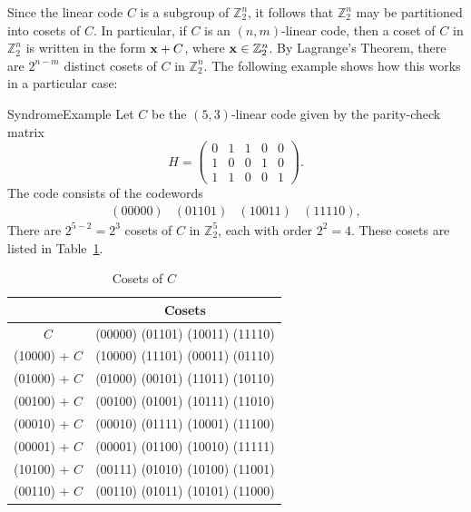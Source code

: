 Since the
linear code $C$ is a subgroup of $\mathbb{Z}_2^n$, it follows that $\mathbb{Z}_2^n$ 
may be partitioned into cosets of $C$. 
In particular,  if $C$ is an $(n,m)$-linear code, then a coset of $C$ in $\mathbb{Z}_2^n$ is written in
the form ${\bold x} + C$, where ${\bold x} \in \mathbb{Z}_2^n$. By Lagrange's Theorem, 
there are $2^{n-m}$ distinct cosets of $C$ in $\mathbb{Z}_2^n$. The following example shows how 
this works in a particular case:

 
\begin{example}{SyndromeExample}
Let $C$ be the $(5,3)$-linear code given by the parity-check matrix
\[
H =
\left(
\begin{array}{cccccc}
0 & 1 & 1 & 0 & 0 \\
1 & 0 & 0 & 1 & 0 \\
1 & 1 & 0 & 0 & 1
\end{array}
\right).
\]
The code consists of the codewords
\[
\begin{array}{cccc}
(00000)& (01101)& (10011)& (11110),
\end{array}
\]
There are $2^{5-2} = 2^3$ cosets of $C$ in $\mathbb{Z}_2^5$, each with
order $2^2 =4$.  These cosets are listed in Table~\ref{table:ErrorAndCorrectionCode:cosets}. 
\end{example}
 
 
\begin{table}
\caption{Cosets of $C$\label{table:ErrorAndCorrectionCode:cosets}}{\small
\begin{center}
\begin{tabular}{|c|c|}
\hline
 & Cosets \\
\hline
          $C$ & (00000)  (01101)  (10011)  (11110) \\
(10000) + $C$ & (10000)  (11101)  (00011)  (01110) \\
(01000) + $C$ & (01000)  (00101)  (11011)  (10110) \\
(00100) + $C$ & (00100)  (01001)  (10111)  (11010) \\
(00010) + $C$ & (00010)  (01111)  (10001)  (11100) \\
(00001) + $C$ & (00001)  (01100)  (10010)  (11111) \\
(10100) + $C$ & (00111)  (01010)  (10100)  (11001) \\
(00110) + $C$ & (00110)  (01011)  (10101)  (11000) \\
\hline
\end{tabular}
\end{center}
}
\end{table}
 
